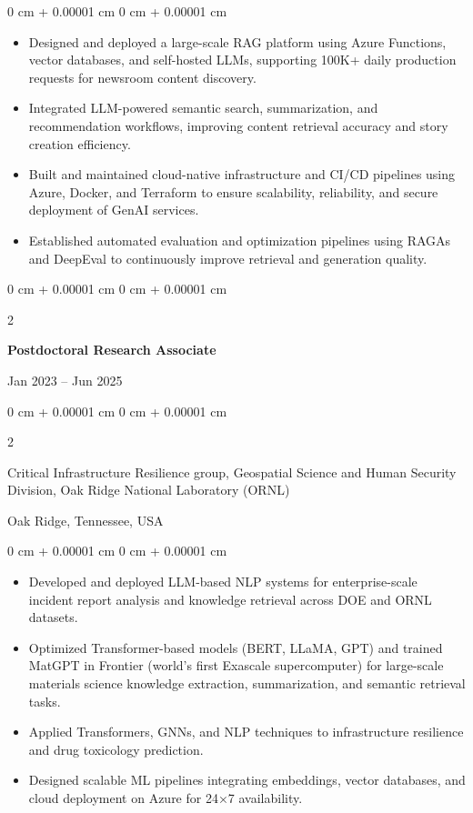 \documentclass[10pt, letterpaper]{article}
\newenvironment{highlights}{
    \begin{itemize}[
        topsep=0.10 cm,
        parsep=0.10 cm,
        partopsep=0pt,
        itemsep=0pt,
        leftmargin=0 cm + 10pt
    ]
}{
    \end{itemize}
} %
\newenvironment{onecolentry}{
    \begin{adjustwidth}{
        0 cm + 0.00001 cm
    }{
        0 cm + 0.00001 cm
    }
}{
    \end{adjustwidth}
} %
\newenvironment{twocolentry}[2][]{
    \onecolentry
    \def\secondColumn{#2}
    \setcolumnwidth{\fill, 4.5 cm}
    \begin{paracol}{2}
}{
    \switchcolumn \raggedleft \secondColumn
    \end{paracol}
    \endonecolentry
} %
\begin{document}
    \begin{onecolentry}
        \begin{highlights}
            \item Designed and deployed a large-scale RAG platform using Azure Functions, vector databases, and self-hosted LLMs, supporting 100K+ daily production requests for newsroom content discovery.
            \item Integrated LLM-powered semantic search, summarization, and recommendation workflows, improving content retrieval accuracy and story creation efficiency.
            \item Built and maintained cloud-native infrastructure and CI/CD pipelines using Azure, Docker, and Terraform to ensure scalability, reliability, and secure deployment of GenAI services.
            \item Established automated evaluation and optimization pipelines using RAGAs and DeepEval to continuously improve retrieval and generation quality.
        \end{highlights}
    \end{onecolentry}

\vspace{1mm}
    
    \begin{twocolentry}{Jan 2023 -- Jun 2025}
        \textbf{Postdoctoral Research Associate}
    \end{twocolentry}
    \begin{twocolentry}{Oak Ridge, Tennessee, USA}
        Critical Infrastructure Resilience group, Geospatial Science and Human Security Division, Oak Ridge National Laboratory (ORNL)
    \end{twocolentry}
    \vspace{0.10 cm}
    \begin{onecolentry}
        \begin{highlights}
            \item Developed and deployed LLM-based NLP systems for enterprise-scale incident report analysis and knowledge retrieval across DOE and ORNL datasets.
            \item Optimized Transformer-based models (BERT, LLaMA, GPT) and trained MatGPT in Frontier (world’s first Exascale supercomputer) for large-scale materials science knowledge extraction, summarization, and semantic retrieval tasks.
            \item Applied Transformers, GNNs, and NLP techniques to infrastructure resilience and drug toxicology prediction.
            \item Designed scalable ML pipelines integrating embeddings, vector databases, and cloud deployment on Azure for 24×7 availability.
        \end{highlights}
    \end{onecolentry}
\end{document}
